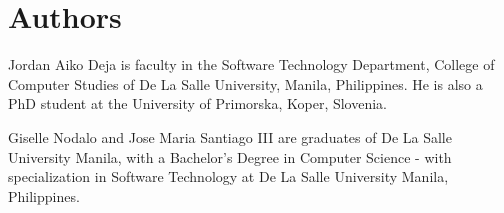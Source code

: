 \documentclass{sigchi-ext}
\begin{document}
\section{Authors}
Jordan Aiko Deja is faculty in the Software Technology Department, College of Computer Studies of De La Salle University, Manila, Philippines. He is also a PhD student at the University of Primorska, Koper, Slovenia. 

Giselle Nodalo and Jose Maria Santiago III  are graduates of De La Salle University Manila, with a Bachelor's Degree in Computer Science - with specialization in Software Technology at De La Salle University Manila, Philippines.



\end{document}

